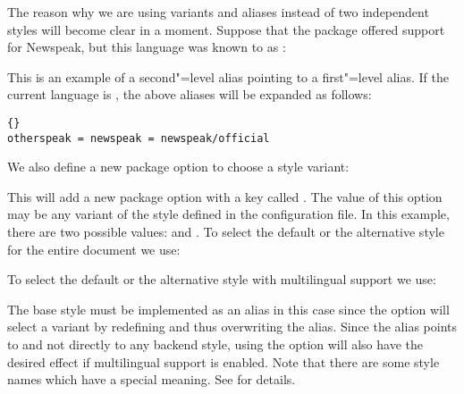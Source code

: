 \documentclass{ltxdockit}[2010/09/26]
\begin{document}
\begin{ltxcode}
\end{ltxcode}
%
The reason why we are using variants and aliases instead of two independent styles will become clear in a moment. Suppose that the  package offered support for Newspeak, but this language was known to  as :

\begin{ltxcode}
\end{ltxcode}
%
This is an example of a second"=level alias pointing to a first"=level alias. If the current language is , the above aliases will be expanded as follows:

\begin{lstlisting}[style=plain]{}
otherspeak = newspeak = newspeak/official
\end{lstlisting}
%
We also define a new package option to choose a style variant:

\begin{ltxcode}
\end{ltxcode}
%
This will add a new package option with a key called . The value of this option may be any variant of the  style defined in the configuration file. In this example, there are two possible values:  and . To select the default or the alternative style for the entire document we use:

\begin{ltxcode}
\usepackage[style=newspeak]{csquotes}
\usepackage[style=newspeak,newspeak=unofficial]{csquotes}
\end{ltxcode}
%
To select the default or the alternative style with multilingual support we use:

\begin{ltxcode}
\usepackage[babel]{csquotes}
\usepackage[babel,newspeak=unofficial]{csquotes}
\end{ltxcode}
%
The base style must be implemented as an alias in this case since the  option will select a variant by redefining and thus overwriting the  alias. Since the  alias points to  and not directly to any backend style, using the  option will also have the desired effect if multilingual support is enabled. Note that there are some style names which have a special meaning. See  for details.
\end{document}
